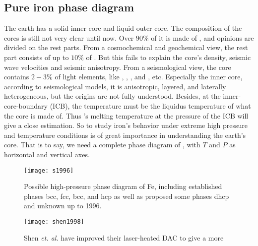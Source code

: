 
\subsection{Pure iron phase diagram}
\label{ssec:phase}

The earth has a solid inner core and liquid outer core.
The composition of the cores is still not very clear until now.
Over $90\%$ of it is made of ,
and opinions are divided on the rest parts.
From a cosmochemical and geochemical view,
the rest part consists of up to $10\%$ of \cite{McDonough:1995iz}.
But this fails to explain the core's
density, seismic wave velocities
and seismic anisotropy.
From a seismological view, the core contains
$2-3\%$ of light elements, like , , ,  and , etc.
Especially the inner core,
according to seismological models, it is anisotropic, layered, and laterally heterogeneous, but the origins are not fully understood.
Besides,
at the inner-core-boundary (ICB),
the temperature must be the liquidus temperature of what the core is made of.
Thus 's melting temperature at the pressure of
the ICB will give a close estimation.
So to study iron's behavior under extreme high pressure and temperature
conditions is of great importance in understanding the earth's core.
That is to say, we need a complete phase diagram of , with
$T$ and $P$ as horizontal and vertical axes.

\begin{figure}[h]
	\centering
	\begin{minipage}[t]{.5\linewidth}
		\centering
		\texttt{[image: s1996]}
		\caption{Possible high-pressure phase diagram of Fe, including established phases    bcc, fcc, bcc, and hcp as well as proposed some phases dhcp and unknown up to
			1996\cite{Soderlind:1996du}.}
		\label{fig:fepd:a}
	\end{minipage}%
	\hfil
	\begin{minipage}[t]{.5\linewidth}
		\centering
		\texttt{[image: shen1998]}
		\caption{Shen \textit{et. al.} have improved their laser-heated DAC to give a
			more }
		\label{fig:fepd:b}
	\end{minipage}
\end{figure}